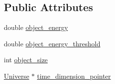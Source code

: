 \subsection*{Public Attributes}
\begin{DoxyCompactItemize}
\item 
double \mbox{\hyperlink{class_universe_ab64777e25c83216e7a91d2761a10463c}{object\+\_\+energy}}
\item 
double \mbox{\hyperlink{class_universe_a17c8d799331a5b32837f285c12cbe858}{object\+\_\+energy\+\_\+threshold}}
\item 
int \mbox{\hyperlink{class_universe_a64f4f4025c9be1d84492c766a002a6d4}{object\+\_\+size}}
\item 
\mbox{\hyperlink{class_universe}{Universe}} $\ast$ \mbox{\hyperlink{class_universe_a3ce4365c727cb6eb5b650146a4188b9b}{time\+\_\+dimension\+\_\+pointer}}
\end{DoxyCompactItemize}
